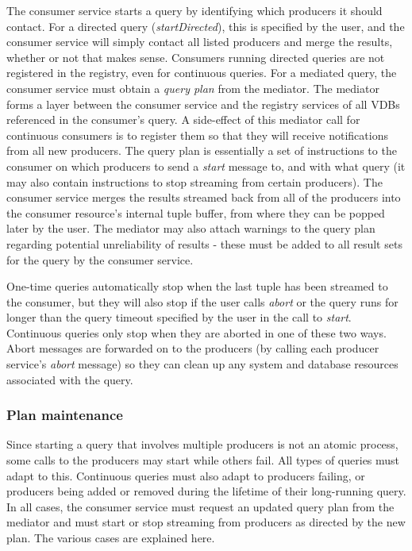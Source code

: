 The consumer service starts a query by identifying which producers it should 
contact. For a directed query (\textit{startDirected}), this is specified by 
the user, and the consumer service will simply contact all listed producers and 
merge the results, whether or not that makes sense. Consumers running directed 
queries are not registered in the registry, even for continuous queries.  For a 
mediated query, the consumer service must obtain a 
\textit{query plan} from the mediator. The mediator forms a layer between the 
consumer service and the registry services of all VDBs referenced in the 
consumer's query. A side-effect of this mediator call for continuous consumers 
is to register them so that they will receive notifications from all new 
producers. The query plan is essentially a set of instructions to the consumer 
on which producers to send a \textit{start} message to, and with what query (it 
may also contain instructions to stop streaming from certain producers). The 
consumer service merges the results streamed back from all of the producers 
into the consumer resource's internal tuple buffer, from where they can be 
popped later by the user. The mediator may also attach warnings to the query 
plan regarding potential unreliability of results - these must be added to all 
result sets for the query by the consumer service.

One-time queries automatically stop when the last tuple has been streamed
to the consumer, but they will also stop if the user calls \textit{abort}
or the query runs for longer than the query timeout specified by the user in
the call to \textit{start}. Continuous queries only stop when they are aborted
in one of these two ways. Abort messages are forwarded on to the producers (by
calling each producer service's \textit{abort} message) so they can clean up any
system and database resources associated with the query.

\subsubsection{Plan maintenance}\label{sec:ConsumerPlanMaintenance}

Since starting a query that involves multiple producers is not an atomic
process, some calls to the producers may start while others fail. All types
of queries must adapt to this. Continuous queries must also adapt to
producers failing, or producers being added or removed during the lifetime of
their long-running query. In all cases, the consumer service must request an
updated query plan from the mediator and must start or stop streaming from
producers as directed by the new plan. The various cases are explained here.

